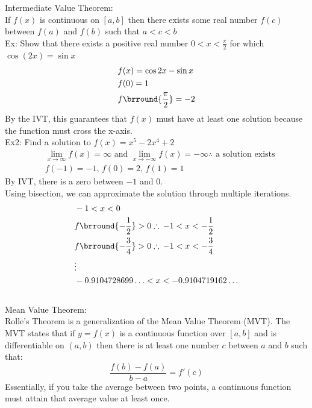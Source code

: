Intermediate Value Theorem:\\
If $f(x)$ is continuous on $[a,b]$ then there exists some real number $f(c)$ between $f(a)$ and $f(b)$ such that $a<c<b$\\
Ex: Show that there exists a positive real number $0<x<\frac{\pi}{2}$ for which $\cos(2x)=\sin x$
\begin{align*}
    &f(x)=\cos 2x-\sin x\\
    &f(0)=1\\
    &f\brround{\frac{\pi}{2}}=-2
\end{align*}
By the IVT, this guarantees that $f(x)$ must have at least one solution because the function must cross the x-axis.\\
Ex2: Find a solution to $f(x)=x^5-2x^4+2$
\begin{align*}
    &\lim_{x\to\infty}f(x)=\infty\text{ and }\lim_{x\to-\infty}f(x)=-\infty\therefore\text{ a solution exists}\\
    &f(-1)=-1,\,f(0)=2,\,f(1)=1
\end{align*}
By IVT, there is a zero between $-1$ and 0.\\
Using bisection, we can approximate the solution through multiple iterations.
\begin{align*}
    &-1<x<0\\
    &f\brround{-\frac{1}{2}}>0\therefore\,-1<x<-\frac{1}{2}\\
    &f\brround{-\frac{3}{4}}>0\therefore\,-1<x<-\frac{3}{4}\\
    &\vdots\\
    &-0.9104728699\ldots<x<-0.9104719162\ldots
\end{align*}
\\
Mean Value Theorem:\\
Rolle's Theorem is a generalization of the Mean Value Theorem (MVT). The MVT states that if $y=f(x)$ is a continuous function over $[a,b]$ and is differentiable on $(a,b)$ then there is at least one number $c$ between $a$ and $b$ such that:
$$\frac{f(b)-f(a)}{b-a}=f'(c)$$
Essentially, if you take the average between two points, a continuous function must attain that average value at least once.\\
